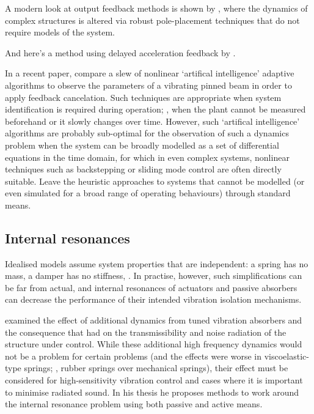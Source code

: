 A modern look at output feedback methods is shown by \cite{mottershead2008},
where the dynamics of complex structures is altered via robust pole-placement
techniques that do not require models of the system.

And here's a method using delayed acceleration feedback by
\textcite{chatterjee2008}.


In a recent paper, \textcite{madkour2007} compare a slew of nonlinear
`artifical intelligence' adaptive algorithms to observe the parameters
of a vibrating pinned beam in order to apply feedback cancelation. %
Such techniques are appropriate when system identification is required
during operation; \ie, when the plant cannot be measured beforehand or
it slowly changes over time. However, such `artifical intelligence'
algorithms are probably sub-optimal for the observation of such a
dynamics problem when the system can be broadly modelled as a set of
differential equations in the time domain, for which in even complex systems,
nonlinear techniques such as backstepping or sliding mode control are 
often directly suitable. Leave the heuristic approaches to systems that cannot be
modelled (or even simulated for a broad range of operating behaviours) through standard means.
  
  

\subsection{Internal resonances}

Idealised models assume system properties that are independent: a
spring has no mass, a damper has no stiffness, \etc. In practise,
however, such simplifications can be far from actual, and internal
resonances of actuators and passive absorbers can decrease the
performance of their intended vibration isolation
mechanisms. 

\textcite{du2003thesis} examined the effect of additional dynamics
from tuned vibration absorbers and the consequence that had on the
transmissibility and noise radiation of the structure under
control. While these additional high frequency dynamics would not be a
problem for certain problems (and the effects were worse in
viscoelastic-type springs; \ie, rubber springs over mechanical springs),
their effect must be considered for high-sensitivity vibration control
and cases where it is important to minimise radiated sound. In his
thesis he proposes methods to work around the internal resonance
problem using both passive and active means.

